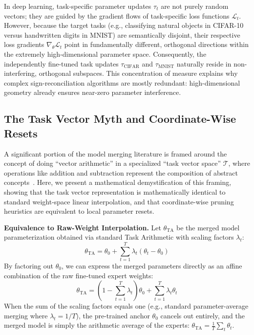 \documentclass{article}
\begin{document}
In deep learning, task-specific parameter updates $\tau_t$ are not purely random vectors; they are guided by the gradient flows of task-specific loss functions $\mathcal{L}_t$. However, because the target tasks (e.g., classifying natural objects in CIFAR-10 versus handwritten digits in MNIST) are semantically disjoint, their respective loss gradients $\nabla_\theta \mathcal{L}_t$ point in fundamentally different, orthogonal directions within the extremely high-dimensional parameter space. Consequently, the independently fine-tuned task updates $\tau_{\text{CIFAR}}$ and $\tau_{\text{MNIST}}$ naturally reside in non-interfering, orthogonal subspaces. This concentration of measure explains why complex sign-reconciliation algorithms are mostly redundant: high-dimensional geometry already ensures near-zero parameter interference.

\subsection{The Task Vector Myth and Coordinate-Wise Resets}

A significant portion of the model merging literature is framed around the concept of doing ``vector arithmetic'' in a specialized ``task vector space'' $\mathcal{T}$, where operations like addition and subtraction represent the composition of abstract concepts~\cite{ilharco2022editing}. Here, we present a mathematical demystification of this framing, showing that the task vector representation is mathematically identical to standard weight-space linear interpolation, and that coordinate-wise pruning heuristics are equivalent to local parameter resets.

\textbf{Equivalence to Raw-Weight Interpolation.} Let $\theta_{\text{TA}}$ be the merged model parameterization obtained via standard Task Arithmetic with scaling factors $\lambda_t$:
\begin{equation}
    \theta_{\text{TA}} = \theta_0 + \sum_{t=1}^T \lambda_t (\theta_t - \theta_0)
\end{equation}
By factoring out $\theta_0$, we can express the merged parameters directly as an affine combination of the raw fine-tuned expert weights:
\begin{equation}
    \theta_{\text{TA}} = \left( 1 - \sum_{t=1}^T \lambda_t \right) \theta_0 + \sum_{t=1}^T \lambda_t \theta_t
\end{equation}
When the sum of the scaling factors equals one (e.g., standard parameter-average merging where $\lambda_t = 1/T$), the pre-trained anchor $\theta_0$ cancels out entirely, and the merged model is simply the arithmetic average of the experts: $\theta_{\text{TA}} = \frac{1}{T}\sum_t \theta_t$. 
\end{document}
